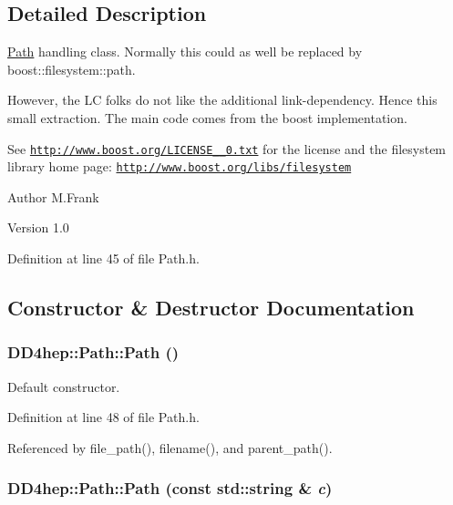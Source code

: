 \subsection{Detailed Description}
\hyperlink{class_d_d4hep_1_1_path}{Path} handling class. Normally this could as well be replaced by boost::filesystem::path.

However, the LC folks do not like the additional link-\/dependency. Hence this small extraction. The main code comes from the boost implementation.

See \href{http://www.boost.org/LICENSE_1_0.txt}{\tt http://www.boost.org/LICENSE\_\_\-0.txt} for the license and the filesystem library home page: \href{http://www.boost.org/libs/filesystem}{\tt http://www.boost.org/libs/filesystem}

\begin{DoxyAuthor}{Author}
M.Frank 
\end{DoxyAuthor}
\begin{DoxyVersion}{Version}
1.0 
\end{DoxyVersion}


Definition at line 45 of file Path.h.

\subsection{Constructor \& Destructor Documentation}
\hypertarget{class_d_d4hep_1_1_path_a43d8eda2bc0394eca5d44ded6556d434}{
\subsubsection[{Path}]{\setlength{\rightskip}{0pt plus 5cm}DD4hep::Path::Path ()}}
\label{class_d_d4hep_1_1_path_a43d8eda2bc0394eca5d44ded6556d434}


Default constructor. 

Definition at line 48 of file Path.h.

Referenced by file\_\-path(), filename(), and parent\_\-path().\hypertarget{class_d_d4hep_1_1_path_a29df9b52c07dfecc7015aec057ffe113}{
\subsubsection[{Path}]{\setlength{\rightskip}{0pt plus 5cm}DD4hep::Path::Path (const std::string \& {\em c})}}
\label{class_d_d4hep_1_1_path_a29df9b52c07dfecc7015aec057ffe113}


